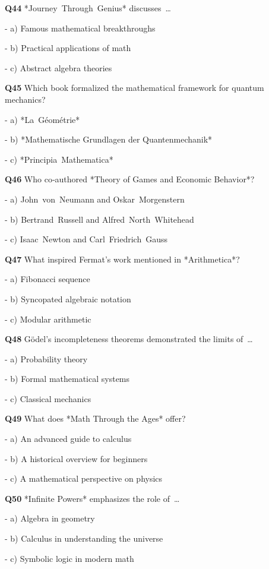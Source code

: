 \textbf{Q44} *Journey Through Genius* discusses …\par
\quad - a) Famous mathematical breakthroughs\par
\quad - b) Practical applications of math\par
\quad - c) Abstract algebra theories\par

\textbf{Q45} Which book formalized the mathematical framework for quantum mechanics?\par
\quad - a) *La Géométrie*\par
\quad - b) *Mathematische Grundlagen der Quantenmechanik*\par
\quad - c) *Principia Mathematica*\par

\textbf{Q46} Who co‑authored *Theory of Games and Economic Behavior*?\par
\quad - a) John von Neumann and Oskar Morgenstern\par
\quad - b) Bertrand Russell and Alfred North Whitehead\par
\quad - c) Isaac Newton and Carl Friedrich Gauss\par

\textbf{Q47} What inspired Fermat's work mentioned in *Arithmetica*?\par
\quad - a) Fibonacci sequence\par
\quad - b) Syncopated algebraic notation\par
\quad - c) Modular arithmetic\par

\textbf{Q48} Gödel's incompleteness theorems demonstrated the limits of …\par
\quad - a) Probability theory\par
\quad - b) Formal mathematical systems\par
\quad - c) Classical mechanics\par

\textbf{Q49} What does *Math Through the Ages* offer?\par
\quad - a) An advanced guide to calculus\par
\quad - b) A historical overview for beginners\par
\quad - c) A mathematical perspective on physics\par

\textbf{Q50} *Infinite Powers* emphasizes the role of …\par
\quad - a) Algebra in geometry\par
\quad - b) Calculus in understanding the universe\par
\quad - c) Symbolic logic in modern math\par